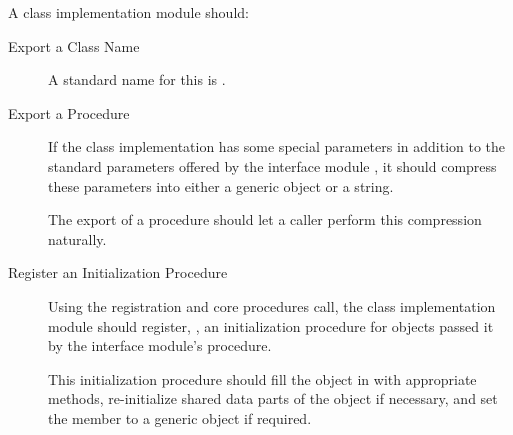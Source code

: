 A class implementation module should:
\begin{description}
\item[Export a Class Name]\indent\par

A standard name for this is .
\item[Export a  Procedure]\indent\par

If the class implementation has some special parameters in addition to the
standard parameters offered by the interface module , it should
compress these parameters into either a generic object or a string.

The export of a  procedure should let a caller perform this
compression naturally.

\item[Register an Initialization Procedure]\indent\par

Using the registration and core procedures  call, the class
implementation module should register, , an
initialization procedure for objects passed it by the interface module's
 procedure.

This initialization procedure should fill the object in with appropriate
methods, re-initialize shared data parts of the object if necessary, and
set the  member to a generic object if required.

\end{description}



